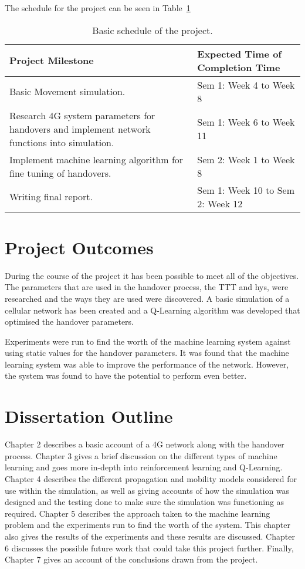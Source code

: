 The schedule for the project can be seen in Table~\ref{tab:sch}
\begin{table}[H]
  \begin{center}
    \begin{tabular}{| p{8cm} | p{5.5cm} |}
  	  \hline
      \textbf{Project Milestone} & \textbf{Expected Time of Completion Time} \\ \hline
      Basic Movement simulation. & Sem 1: Week 4 to Week 8  \\ \hline
      Research 4G system parameters for handovers and implement network functions into simulation. & Sem 1: Week 6 to Week 11 \\ \hline
      Implement machine learning algorithm for fine tuning of handovers. & Sem 2: Week 1 to Week 8 \\ \hline
      Writing final report. & Sem 1: Week 10 to Sem 2: Week 12  \\ \hline
  	\end{tabular}
  \end{center}
  \caption{Basic schedule of the project.}
  \label{tab:sch}
\end{table}
\section{Project Outcomes}
During the course of the project it has been possible to meet all of the objectives. The parameters that are used in the handover process, the \ac{TTT} and \ac{hys}, were researched and the ways they are used were discovered. A basic simulation of a cellular network has been created and a Q-Learning algorithm was developed that optimised the handover parameters.

Experiments were run to find the worth of the machine learning system against using static values for the handover parameters. It was found that the machine learning system was able to improve the performance of the network. However, the system was found to have the potential to perform even better.   
\section{Dissertation Outline}
Chapter 2 describes a basic account of a 4G network along with the handover process. Chapter 3 gives a brief discussion on the different types of machine learning and goes more in-depth into reinforcement learning and Q-Learning. Chapter 4 describes the different propagation and mobility models considered for use within the simulation, as well as giving accounts of how the simulation was designed and the testing done to make sure the simulation was functioning as required. Chapter 5 describes the approach taken to the machine learning problem and the experiments run to find the worth of the system. This chapter also gives the results of the experiments and these results are discussed. Chapter 6 discusses the possible future work that could take this project further. Finally, Chapter 7 gives an account of the conclusions drawn from the project.
